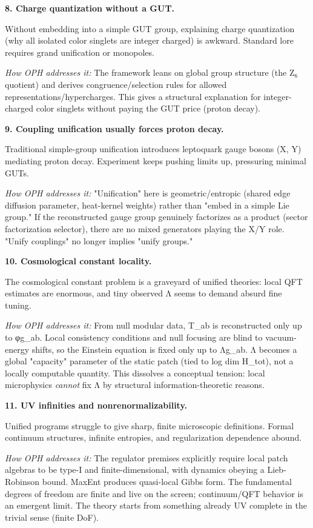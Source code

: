 \textbf{8. Charge quantization without a GUT.}

Without embedding into a simple GUT group, explaining charge quantization (why all isolated color singlets are integer charged) is awkward. Standard lore requires grand unification or monopoles.

\emph{How OPH addresses it:} The framework leans on global group structure (the Z₆ quotient) and derives congruence/selection rules for allowed representations/hypercharges. This gives a structural explanation for integer-charged color singlets without paying the GUT price (proton decay).

\textbf{9. Coupling unification usually forces proton decay.}

Traditional simple-group unification introduces leptoquark gauge bosons (X, Y) mediating proton decay. Experiment keeps pushing limits up, pressuring minimal GUTs.

\emph{How OPH addresses it:} "Unification" here is geometric/entropic (shared edge diffusion parameter, heat-kernel weights) rather than "embed in a simple Lie group." If the reconstructed gauge group genuinely factorizes as a product (sector factorization selector), there are no mixed generators playing the X/Y role. "Unify couplings" no longer implies "unify groups."

\textbf{10. Cosmological constant locality.}

The cosmological constant problem is a graveyard of unified theories: local QFT estimates are enormous, and tiny observed Λ seems to demand absurd fine tuning.

\emph{How OPH addresses it:} From null modular data, T\_ab is reconstructed only up to φg\_ab. Local consistency conditions and null focusing are blind to vacuum-energy shifts, so the Einstein equation is fixed only up to Λg\_ab. Λ becomes a global "capacity" parameter of the static patch (tied to log dim H\_tot), not a locally computable quantity. This dissolves a conceptual tension: local microphysics \emph{cannot} fix Λ by structural information-theoretic reasons.

\textbf{11. UV infinities and nonrenormalizability.}

Unified programs struggle to give sharp, finite microscopic definitions. Formal continuum structures, infinite entropies, and regularization dependence abound.

\emph{How OPH addresses it:} The regulator premises explicitly require local patch algebras to be type-I and finite-dimensional, with dynamics obeying a Lieb-Robinson bound. MaxEnt produces quasi-local Gibbs form. The fundamental degrees of freedom are finite and live on the screen; continuum/QFT behavior is an emergent limit. The theory starts from something already UV complete in the trivial sense (finite DoF).

